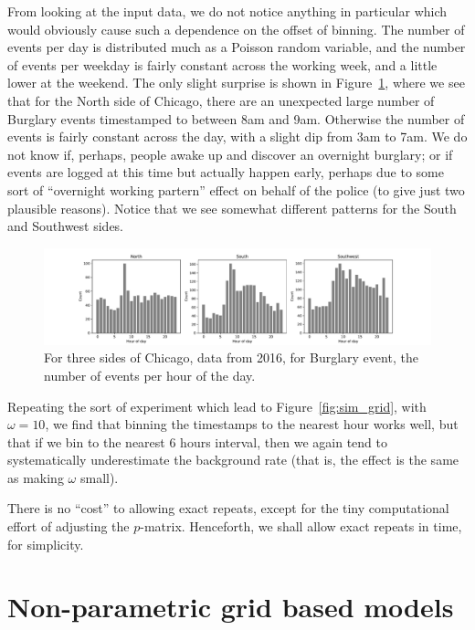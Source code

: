 \documentclass[twoside,a4paper]{article}
\theoremstyle{plain}
\theoremstyle{definition}
\begin{document}
From looking at the input data, we do not notice anything in particular which would
obviously cause such a dependence on the offset of binning.  The number of events per day
is distributed much as a Poisson random variable, and the number of events per weekday
is fairly constant across the working week, and a little lower at the weekend.  The
only slight surprise is shown in Figure~\ref{fig:by_hour_of_day}, where we see that
for the North side of Chicago, there
are an unexpected large number of Burglary events timestamped to between 8am and 9am.
Otherwise the number of events is fairly constant across the day, with a slight dip
from 3am to 7am.  We do not know if, perhaps, people awake up and discover an overnight
burglary; or if events are logged at this time but actually happen early, perhaps due
to some sort of ``overnight working partern'' effect on behalf of the police (to give
just two plausible reasons).  Notice that we see somewhat different patterns for the
South and Southwest sides.

\begin{figure}
  \includegraphics[width=\textwidth]{../notebooks/events_by_hour.pdf}
  \caption{For three sides of Chicago, data from 2016, for Burglary event,
the number of events per hour of the day.}
  \label{fig:by_hour_of_day}
\end{figure}

Repeating the sort of experiment which lead to Figure~\ref{fig:sim_grid}, with $\omega=10$,
we find that binning the timestamps to the nearest hour works well, but that if we bin to
the nearest 6 hours interval, then we again tend to systematically underestimate the
background rate (that is, the effect is the same as making $\omega$ small).

There is no ``cost'' to allowing exact repeats, except for the tiny computational effort
of adjusting the $p$-matrix.  Henceforth, we shall allow exact repeats in time, for simplicity.





\section{Non-parametric grid based models}
\end{document}

